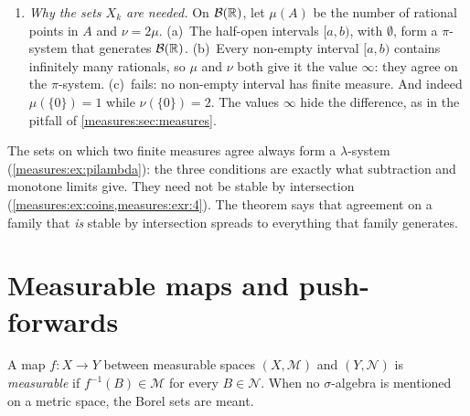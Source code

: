 \begin{notechapter}
\begin{example}
\begin{enumerate}[nosep]
\begin{itemize}[nosep]
                the same probability to ``the first coin shows heads'',
                ``the second coin shows heads'' and ``both show heads'';
                both give $X$ the probability $1$.
          \item[(c)] $X_k = X$, with $\mu(X) = 1$.
        \end{itemize}
        So two probability measures on two coins are equal as soon as
        they agree on these three events. 
        reached the same conclusion by computing each outcome; here no
        computation is needed. The two measures of that example differ
        because check~(b) fails at $A\cap B$: they agree on $A$ and
        on $B$ only, and $\{A, B\}$ is not a $\pi$-system.
  \item \emph{Why the sets $X_k$ are needed.} On $\mathcal B(\mathbb{R})$, let
        $\mu(A)$ be the number of rational points in $A$ and
        $\nu = 2\mu$. (a)~The half-open intervals $[a, b)$, with
        $\emptyset$, form a $\pi$-system that generates
        $\mathcal B(\mathbb{R})$. (b)~Every non-empty interval $[a, b)$ contains
        infinitely many rationals, so $\mu$ and $\nu$ both give it the
        value $\infty$: they agree on the $\pi$-system. (c)~fails: no
        non-empty interval has finite measure. And indeed
        $\mu(\{0\}) = 1$ while $\nu(\{0\}) = 2$. The values $\infty$
        hide the difference, as in the pitfall of
        \cref{measures:sec:measures}.
\end{enumerate}
\end{example}

\begin{intuition}
The sets on which two finite measures agree always form a
$\lambda$-system (\cref{measures:ex:pilambda}): the three conditions are
exactly what subtraction and monotone limits give. They need not be
stable by intersection (\cref{measures:ex:coins,measures:exr:4}). The
theorem says that agreement on a family that \emph{is} stable by
intersection spreads to everything that family generates.
\end{intuition}

\section{Measurable maps and push-forwards}\label{measures:sec:maps}

\begin{definition}\label{measures:def:measurable}
A map $f:X\to Y$ between measurable spaces $(X, \mathcal M)$ and
$(Y, \mathcal N)$ is \emph{measurable} if
$f^{-1}(B)\in\mathcal M$ for every $B\in\mathcal N$. When no
$\sigma$-algebra is mentioned on a metric space, the Borel sets are
meant.
\end{definition}


\end{notechapter}

